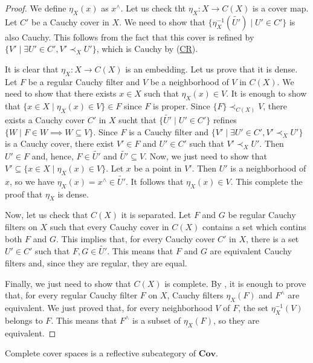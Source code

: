 \documentclass[reqno]{amsart}
\newcommand{\axref}[1]{(\hyperref[ax:#1]{#1})}
\theoremstyle{definition}
\theoremstyle{remark}
\numberwithin{figure}{section}
\newcommand{\rb}{\prec}
\newcommand{\cat}[1]{\mathbf{#1}}
\begin{document}
\begin{proof}
We define $\eta_X(x)$ as $x^\wedge$.
Let us check tht $\eta_X : X \to C(X)$ is a cover map.
Let $C'$ be a Cauchy cover in $X$.
We need to show that $\{ \eta_X^{-1}(\widetilde{U'}) \mid U' \in C' \}$ is also Cauchy.
This follows from the fact that this cover is refined by $\{ V' \mid \exists U' \in C', V' \rb_X U' \}$, which is Cauchy by \axref{CR}.

It is clear that $\eta_X : X \to C(X)$ is an embedding.
Let us prove that it is dense.
Let $F$ be a regular Cauchy filter and $V$ be a neighborhood of $V$ in $C(X)$.
We need to show that there exists $x \in X$ such that $\eta_X(x) \in V$.
It is enough to show that $\{ x \in X \mid \eta_X(x) \in V \} \in F$ since $F$ is proper.
Since $\{ F \} \rb_{C(X)} V$, there exists a Cauchy cover $C'$ in $X$ sucht that $\{ \widetilde{U'} \mid U' \in C' \}$ refines $\{ W \mid F \in W \implies W \subseteq V \}$.
Since $F$ is a Cauchy filter and $\{ V' \mid \exists U' \in C', V' \rb_X U' \}$ is a Cauchy cover, there exist $V' \in F$ and $U' \in C'$ such that $V' \rb_X U'$.
Then $U' \in F$ and, hence, $F \in \widetilde{U'}$ and $\widetilde{U'} \subseteq V$.
Now, we just need to show that $V' \subseteq \{ x \in X \mid \eta_X(x) \in V \}$.
Let $x$ be a point in $V'$.
Then $U'$ is a neighborhood of $x$, so we have $\eta_X(x) = x^\wedge \in \widetilde{U'}$.
It follows that $\eta_X(x) \in V$.
This complete the proof that $\eta_X$ is dense.

Now, let us check that $C(X)$ it is separated.
Let $F$ and $G$ be regular Cauchy filters on $X$ such that every Cauchy cover in $C(X)$ contains a set which contins both $F$ and $G$.
This implies that, for every Cauchy cover $C'$ in $X$, there is a set $U' \in C'$ such that $F,G \in \widetilde{U'}$.
This means that $F$ and $G$ are equivalent Cauchy filters and, since they are regular, they are equal.

Finally, we just need to show that $C(X)$ is complete.
By , it is enough to prove that, for every regular Cauchy filter $F$ on $X$, Cauchy filters $\eta_X(F)$ and $F^\wedge$ are equivalent.
We just proved that, for every neighborhood $V$ of $F$, the set $\eta_X^{-1}(V)$ belongs to $F$.
This means that $F^\wedge$ is a subset of $\eta_X(F)$, so they are equivalent.
\end{proof}

\begin{cor}
Complete cover spaces is a reflective subcategory of $\cat{Cov}$.
\end{cor}
\end{document}
